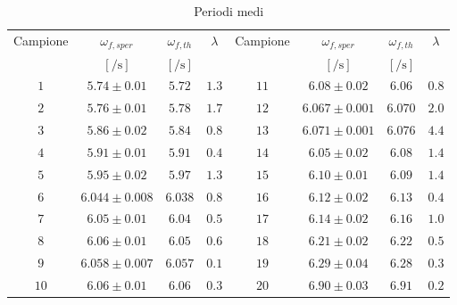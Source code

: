\documentclass[a4paper,11pt,oneside]{article}
\begin{document}
\begin{table}[h!]
    \centering
    \begin{tabular}{|c|c|c|c||c|c|c|c|}
        \hline
        \multirow{2}{*}{Campione} & $\omega_{f,sper}$ & $\omega_{f,th}$ & \multirow{2}{*}{$\lambda$} & \multirow{2}{*}{Campione} & $\omega_{f,sper}$ & $\omega_{f,th}$ & \multirow{2}{*}{$\lambda$}\\
         & $[\si{\per\second}]$&$[\si{\per\second}]$ &  & & $[\si{\per\second}]$&$[\si{\per\second}]$ &\\
        \hline
        \rowcolor[rgb]{0.85,0.85,0.85}$1$ & $5.74\pm0.01$ & $5.72$ & $1.3$ & $11$ & $6.08\pm0.02$ & $6.06$ & $0.8$\\ \hline
        $2$ & $5.76\pm0.01$ & $5.78$ & $1.7$ & $12$ & $6.067\pm0.001$ & $6.070$ & $2.0$\\ \hline
        \rowcolor[rgb]{0.85,0.85,0.85}$3$ & $5.86\pm0.02$ & $5.84$ & $0.8$ & $13$ & $6.071\pm0.001$ & $6.076$ & $4.4$\\ \hline
        $4$ & $5.91\pm0.01$ & $5.91$ & $0.4$ & $14$ & $6.05\pm0.02$ & $6.08$ & $1.4$\\ \hline
        \rowcolor[rgb]{0.85,0.85,0.85}$5$ & $5.95\pm0.02$ & $5.97$ & $1.3$ & $15$ & $6.10\pm0.01$ & $6.09$ & $1.4$\\ \hline
        $6$ & $6.044\pm0.008$ & $6.038$ & $0.8$ & $16$ & $6.12\pm0.02$ & $6.13$ & $0.4$\\ \hline
        \rowcolor[rgb]{0.85,0.85,0.85}$7$ & $6.05\pm0.01$ & $6.04$ & $0.5$ & $17$ & $6.14\pm0.02$ & $6.16$ & $1.0$\\ \hline
        $8$ & $6.06\pm0.01$ & $6.05$ & $0.6$ & $18$ & $6.21\pm0.02$ & $6.22$ & $0.5$\\ \hline
        \rowcolor[rgb]{0.85,0.85,0.85}$9$ & $6.058\pm0.007$ & $6.057$ & $0.1$ & $19$ & $6.29\pm0.04$ & $6.28$ & $0.3$\\ \hline
        $10$ & $6.06\pm0.01$ & $6.06$ & $0.3$ & $20$ & $6.90\pm0.03$ & $6.91$ & $0.2$\\ \hline
    \end{tabular}
    \caption{Periodi medi}
    \label{tab:periodi_medi}
\end{table}
\end{document}
